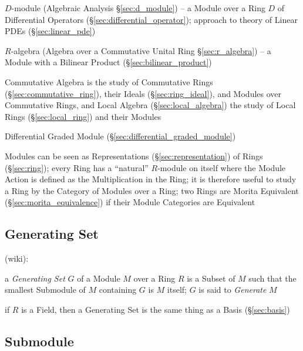 \fist $D$-module (Algebraic Analysis \S\ref{sec:d_module}) -- a Module over a
Ring $D$ of Differential Operators (\S\ref{sec:differential_operator}); approach
to theory of Linear PDEs (\S\ref{sec:linear_pde})

\fist $R$-algebra (Algebra over a Commutative Unital Ring \S\ref{sec:r_algebra})
-- a Module with a Bilinear Product (\S\ref{sec:bilinear_product})

\fist Commutative Algebra is the study of Commutative Rings
(\S\ref{sec:commutative_ring}), their Ideals (\S\ref{sec:ring_ideal}), and
Modules over Commutative Rings, and Local Algebra (\S\ref{sec:local_algebra})
the study of Local Rings (\S\ref{sec:local_ring}) and their Modules

\fist Differential Graded Module (\S\ref{sec:differential_graded_module})

Modules can be seen as Representations (\S\ref{sec:representation}) of Rings
(\S\ref{sec:ring}); every Ring has a ``natural'' $R$-module on itself where the
Module Action is defined as the Multiplication in the Ring; it is therefore
useful to study a Ring by the Category of Modules over a Ring; two Rings are
Morita Equivalent (\S\ref{sec:morita_equivalence}) if their Module Categories
are Equivalent



\subsection{Generating Set}\label{sec:generating_set}

(wiki):

a \emph{Generating Set} $G$ of a Module $M$ over a Ring $R$ is a Subset of $M$
such that the smallest Submodule of $M$ containing $G$ is $M$ itself; $G$ is
said to \emph{Generate} $M$

if $R$ is a Field, then a Generating Set is the same thing as a Basis
(\S\ref{sec:basis})



\subsection{Submodule}\label{sec:submodule}

